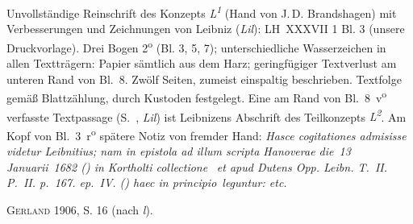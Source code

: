 \begin{ledgroupsized}[r]{114mm}
\footnotesize
\pstart \parindent -6mm
%
Unvollständige Reinschrift des Konzepts \textit{L\textsuperscript{1}}\! (Hand von J.\,D. Brandshagen) mit Ver\-bes\-se\-run\-gen und Zeich\-nun\-gen von Leibniz (\textit{Lil}):
LH~XXXVII 1 Bl. 3 (unsere Druck\-vor\-lage). %
Drei Bogen 2\textsuperscript{o} (Bl. 3, 5, 7);
unterschiedliche Wasserzeichen in allen Textträgern: Papier sämtlich aus dem Harz;
geringfügiger Textverlust am unteren Rand von Bl.~8.
Zwölf Seiten, zumeist einspaltig beschrieben.
Textfolge gemäß Blattzählung, durch Kus\-toden festgelegt.
Eine am Rand von Bl.~8~v\textsuperscript{o} verfasste Textpassage
(S.~, \textit{Lil}) %
ist Leibnizens Abschrift des Teilkonzepts \textit{L\textsuperscript{2}}.
Am Kopf von Bl.~3~r\textsuperscript{o} spätere Notiz von fremder Hand:
\textit{\mbox{Hasce} cogitationes admisisse videtur Leibnitius;
\protect{}%
\protect{}%
nam in epistola ad illum scripta Hanoverae d}\lbrack\textit{ie}\rbrack\ \textit{13 Januar}\lbrack\textit{ii}\rbrack\ \textit{1682 %
(\phantom)\hspace{-1.2mm}%
in Kortholti\protect{} collect}\lbrack\textit{ione}\rbrack\ \textit{ %
et apud Dutens\protect{} Opp. Leibn. T.~II. P.~II. p.~167. ep.~IV.%
\phantom(\hspace{-1.2mm})
haec in pr}\lbrack\textit{incipio}\rbrack\ \textit{leguntur: etc.}
\pend
\end{ledgroupsized}%
%
\begin{ledgroupsized}[r]{114mm}
\footnotesize%
\pstart%
\parindent -6mm
%
\textsc{Gerland} 1906, S. 16 (nach \textit{l}).\cite{00197}
\pend%
\end{ledgroupsized}
